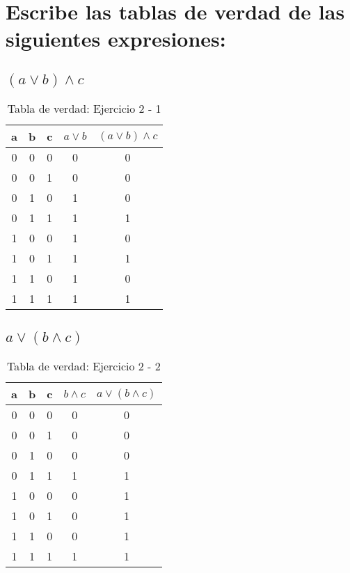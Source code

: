 \section{Escribe las tablas de verdad de las siguientes expresiones:}
\subsection{$(a\vee b)\wedge c$}
\begin{table}[!ht]
    \centering
    \begin{tabular}{|c|c|c|c|c|}
        \hline
        a & b & c & $a\vee b$ & $(a\vee b)\wedge c$ \\
        \hline
        0 & 0 & 0 & 0 & 0 \\
        \hline
        0 & 0 & 1 & 0 & 0 \\
        \hline
        0 & 1 & 0 & 1 & 0 \\
        \hline
        0 & 1 & 1 & 1 & 1 \\
        \hline
        1 & 0 & 0 & 1 & 0 \\
        \hline
        1 & 0 & 1 & 1 & 1 \\
        \hline
        1 & 1 & 0 & 1 & 0 \\
        \hline
        1 & 1 & 1 & 1 & 1 \\
        \hline
    \end{tabular}
    \caption{Tabla de verdad: Ejercicio 2 - 1}\label{table:2-1}
\end{table}
\subsection{$a \vee (b\wedge c)$}
\begin{table}[!ht]
    \centering
    \begin{tabular}{|c|c|c|c|c|}
        \hline
        a & b & c & $b\wedge c$ & $a \vee (b\wedge c)$ \\
        \hline
        0 & 0 & 0 & 0 & 0 \\
        \hline
        0 & 0 & 1 & 0 & 0 \\
        \hline
        0 & 1 & 0 & 0 & 0 \\
        \hline
        0 & 1 & 1 & 1 & 1 \\
        \hline
        1 & 0 & 0 & 0 & 1 \\
        \hline
        1 & 0 & 1 & 0 & 1 \\
        \hline
        1 & 1 & 0 & 0 & 1 \\
        \hline
        1 & 1 & 1 & 1 & 1 \\
        \hline
    \end{tabular}
    \caption{Tabla de verdad: Ejercicio 2 - 2}\label{table:2-2}
\end{table}
\newpage
